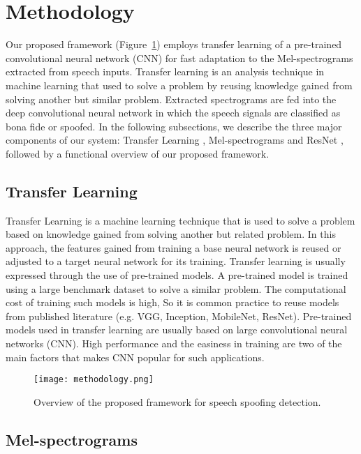 \documentclass[a4paper]{article}
\begin{document}
\section{Methodology}
    Our proposed framework (Figure~\ref{fig:methodology}) employs transfer learning \cite{transref} of a pre-trained convolutional neural network (CNN) for fast adaptation to the Mel-spectrograms extracted from speech inputs. Transfer learning is an analysis technique in machine learning that used to solve a problem by reusing knowledge gained from solving another but similar problem. Extracted spectrograms are fed into the deep convolutional neural network in which the speech signals are classified as bona fide or spoofed. In the following subsections, we describe the three major components of our system: Transfer Learning \cite{transref}, Mel-spectrograms \cite{melref} and ResNet \cite{resnet}, followed by a functional overview of our proposed framework. 

\subsection{Transfer Learning}
    Transfer Learning is a machine learning technique that is used to solve a problem based on knowledge gained from solving another but related problem. In this approach, the features gained from training a base neural network is reused or adjusted to a target neural network for its training. Transfer learning is usually expressed through the use of pre-trained models. A pre-trained model is trained using a large benchmark dataset to solve a similar problem. The computational cost of training such models is high, So it is common practice to reuse models from published literature (e.g. VGG, Inception, MobileNet, ResNet). Pre-trained models used in transfer learning are usually based on large convolutional neural networks (CNN). High performance and the easiness in training are two of the main factors that makes CNN popular for such applications.
    
    
\begin{figure}[t]
  \centering
  \texttt{[image: methodology.png]}
  \caption{Overview of the proposed framework for speech spoofing detection.}
  \label{fig:methodology}
\end{figure}

\subsection{Mel-spectrograms}
\end{document}
